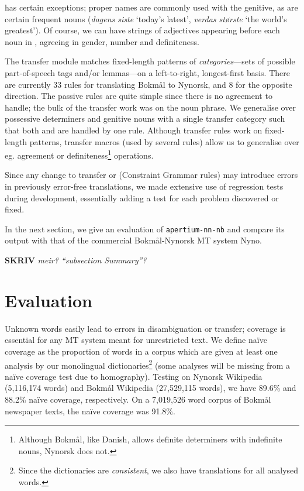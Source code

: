 \documentclass[11pt]{article}
\newcommand{\comment}[1]{\textbf{SKRIV} {\it #1}}
\begin{document}
\Last has certain exceptions; proper names are commonly used with the
genitive, as are certain frequent nouns (\emph{dagens siste} `today's
latest', \emph{verdas største} `the world's greatest'). Of course, we
can have strings of adjectives appearing before each noun in
\Last[a-d], agreeing in gender, number and definiteness. 

The transfer module matches fixed-length patterns of
\emph{categories}—sets of possible part-of-speech tags and/or
lemmas—on a left-to-right, longest-first basis. There are currently 33
rules for translating Bokmål to Nynorsk, and 8 for the opposite
direction. The passive rules are quite simple since there is no
agreement to handle; the bulk of the transfer work was on the noun
phrase. We generalise over possessive determiners and genitive nouns
with a single transfer category such that both \Last[a-b] and
\Last[c-d] are handled by one rule. Although transfer rules work on
fixed-length patterns, transfer macros (used by several rules) allow
us to generalise over eg. agreement or definiteness\footnote{Although
  Bokmål, like Danish, allows definite determiners with indefinite
  nouns, Nynorsk does not.} operations.

Since any change to transfer or (Constraint Grammar rules) may
introduce errors in previously error-free translations, we made
extensive use of regression tests during development, essentially
adding a test for each problem discovered or fixed.

In the next section, we give an evaluation of {\tt apertium-nn-nb} and
compare its output with that of the commercial Bokmål-Nynorsk MT
system Nyno.

\comment{ meir? ``subsection Summary''? }




\section{Evaluation}
\label{sec:eval}

Unknown words easily lead to errors in disambiguation or transfer;
coverage is essential for any MT system meant for unrestricted text.
 We define naïve coverage as the proportion of words in a corpus which
are given at least one analysis by our monolingual
dictionaries\footnote{Since the dictionaries are \emph{consistent}, we
  also have translations for all analysed words.} (some analyses will
be missing from a naïve coverage test due to homography). Testing on
Nynorsk Wikipedia (5,116,174 words) and Bokmål Wikipedia (27,529,115
words), we have 89.6\% and 88.2\% naïve coverage, respectively. On a
7,019,526 word corpus of Bokmål newspaper texts, the naïve coverage
was 91.8\%. 
\end{document}
